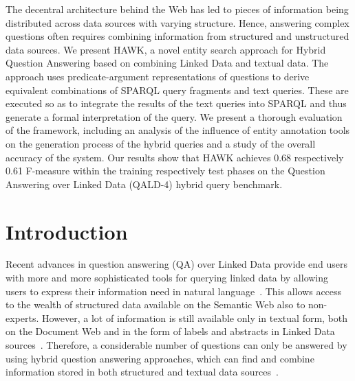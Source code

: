 The decentral architecture behind the Web has led to pieces of information being distributed across data sources with varying structure. Hence, answering complex questions often requires combining information from structured and unstructured data sources.   
We present HAWK, a novel entity search approach for Hybrid Question Answering based on combining Linked Data and textual data.
The approach uses predicate-argument representations of questions to derive equivalent combinations of SPARQL query fragments and text queries. These are executed so as to integrate the results of the text queries into SPARQL and thus generate a formal interpretation of the query.
%
We present a thorough evaluation of the framework, including an analysis of the influence of entity annotation tools on the generation process of the hybrid queries and a study of the overall accuracy of the system. 
Our results show that HAWK achieves 0.68 respectively 0.61 F-measure within the training respectively test phases on the Question Answering over Linked Data (QALD-4) hybrid query benchmark. %


\section{Introduction}
Recent advances in question answering (QA) over Linked Data provide end users with more and more sophisticated tools for querying linked data by allowing users to express their information need in natural language~\cite{SINA_WebSemantic,tbsl,pythia}. 
This allows access to the wealth of structured data available on the Semantic Web also to non-experts. However, a lot of information is still available only in textual form, both on the Document Web and in the form of labels and abstracts in Linked Data sources~\cite{rdflivenews}.
Therefore, a considerable number of questions can only be answered by using hybrid question answering approaches, which  can find and combine information stored in both structured and textual data sources~\cite{combiningLDandIR}.


